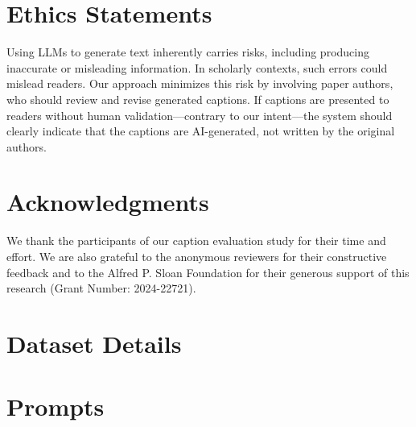 \documentclass[11pt]{article}
\begin{document}
\section{Ethics Statements}
Using LLMs to generate text inherently carries risks, including producing inaccurate or misleading information. 
In scholarly contexts, such errors could mislead readers. 
Our approach minimizes this risk by involving paper authors, who should review and revise generated captions. 
If captions are presented to readers without human validation---contrary to our intent---the system should clearly indicate that the captions are AI-generated, not written by the original authors.










\section*{Acknowledgments}
We thank the participants of our caption evaluation study for their time and effort.
We are also grateful to the anonymous reviewers for their constructive feedback and to the Alfred P. Sloan Foundation for their generous support of this research (Grant Number: 2024-22721).





\appendix

\section{\dataset Dataset Details}\label{app:dataset-details}


% 
% 


\section{Prompts\label{app:prompts}}

\end{document}
